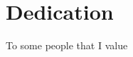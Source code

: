 \documentclass[../thesis.tex]{subfiles}
\begin{document}
\section*{Dedication}
To some people that I value
\end{document}
